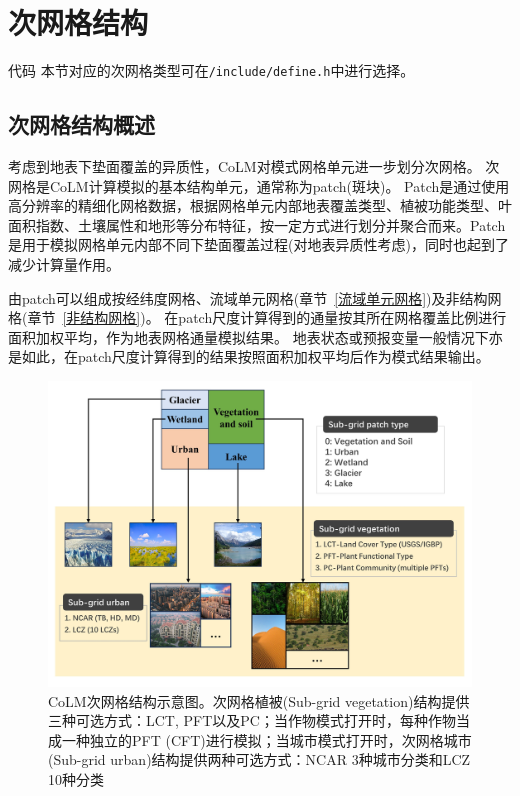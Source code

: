\section{次网格结构}\label{次网格}
\begin{mymdframed}{代码}
  本节对应的次网格类型可在\texttt{/include/define.h}中进行选择。
\end{mymdframed}
\subsection{次网格结构概述}
考虑到地表下垫面覆盖的异质性，CoLM对模式网格单元进一步划分次网格。
次网格是CoLM计算模拟的基本结构单元，通常称为patch(斑块)。
Patch是通过使用高分辨率的精细化网格数据，根据网格单元内部地表覆盖类型、植被功能类型、叶面积指数、土壤属性和地形等分布特征，按一定方式进行划分并聚合而来。Patch是用于模拟网格单元内部不同下垫面覆盖过程(对地表异质性考虑)，同时也起到了减少计算量作用。


由patch可以组成按经纬度网格、流域单元网格(章节~\ref{流域单元网格})及非结构网格(章节~\ref{非结构网格})。
在patch尺度计算得到的通量按其所在网格覆盖比例进行面积加权平均，作为地表网格通量模拟结果。
地表状态或预报变量一般情况下亦是如此，在patch尺度计算得到的结果按照面积加权平均后作为模式结果输出。

{
  \begin{figure}[htbp]
    \centering
    \includegraphics[width=\textwidth]{Figures/模式构架/CoLM次网格结构示意图-v2.jpg}
    \caption[CoLM次网格结构示意图]{CoLM次网格结构示意图。次网格植被(Sub-grid vegetation)结构提供三种可选方式：LCT, PFT以及PC；当作物模式打开时，每种作物当成一种独立的PFT (CFT)进行模拟；当城市模式打开时，次网格城市(Sub-grid urban)结构提供两种可选方式：NCAR 3种城市分类和LCZ 10种分类}
    \label{fig:次网格结构示意图}
  \end{figure}
}



